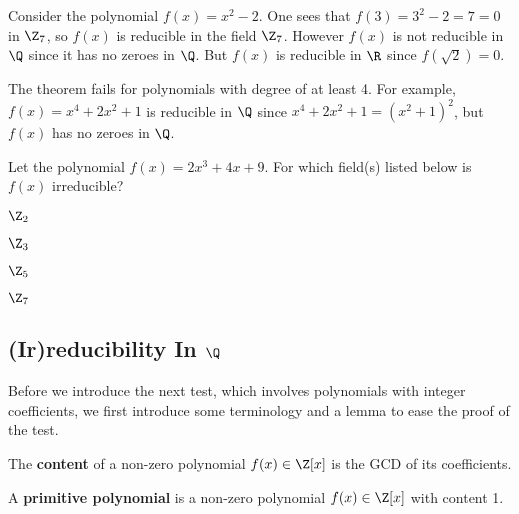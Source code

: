 \begin{example}
    Consider the polynomial $f(x) = x^2 - 2$. One sees that $f(3) = 3^2 - 2 = 7 = 0$ in $\Z_7$, so $f(x)$ is reducible in the field $\Z_7$. However $f(x)$ is not reducible in $\Q$ since it has no zeroes in $\Q$. But $f(x)$ is reducible in $\R$ since $f(\sqrt2) = 0$.
\end{example}

\begin{example}
    The theorem fails for polynomials with degree of at least 4. For example, $f(x) = x^4 + 2x^2 + 1$ is reducible in $\Q$ since $x^4 + 2x^2 + 1 = (x^2+1)^2$, but $f(x)$ has no zeroes in $\Q$.
\end{example}

\begin{exercise}
    Let the polynomial $f(x) = 2x^3 + 4x + 9$. For which field(s) listed below is $f(x)$ irreducible?
    \begin{multicols}{4}
        \begin{partquestions}{\alph*}
            \item $\Z_2$
            \item $\Z_3$
            \item $\Z_5$
            \item $\Z_7$
        \end{partquestions} 
    \end{multicols}
\end{exercise}

\subsection{(Ir)reducibility In $\Q$}
Before we introduce the next test, which involves polynomials with integer coefficients, we first introduce some terminology and a lemma to ease the proof of the test.

\begin{definition}
    The \textbf{content} of a non-zero polynomial $f(x) \in \Z[x]$ is the GCD of its coefficients.
\end{definition}

\begin{definition}
    A \textbf{primitive polynomial} is a non-zero polynomial $f(x) \in \Z[x]$ with content 1.
\end{definition}

